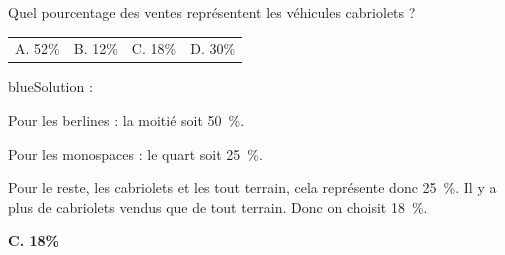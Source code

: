 Quel pourcentage des ventes représentent les véhicules cabriolets ?
\begin{center}
\begin{tabularx}{.92\linewidth}{XXXX} A. 52\% & B. 12\% & C. 18\% & D. 30\%\end{tabularx}
\end{center}

\begin{color}{blue}Solution :\par
Pour les berlines : la moitié soit 50~\%.

Pour les monospaces : le quart soit 25~\%.

Pour le reste, les cabriolets et les tout terrain, cela représente donc 25~\%. Il y a plus de cabriolets vendus que de tout terrain. Donc on choisit 18~\%.

\textbf{C. 18\%}
\end{color}
